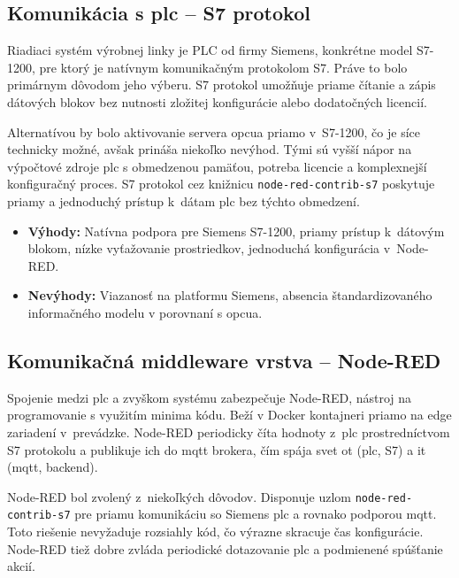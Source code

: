 \subsection{Komunikácia s \acrshort{plc} -- S7 protokol}

Riadiaci systém výrobnej linky je PLC od firmy Siemens, konkrétne model
S7-1200, pre ktorý je natívnym komunikačným protokolom S7. Práve to bolo
primárnym dôvodom jeho výberu. S7 protokol umožňuje priame čítanie a zápis
dátových blokov bez nutnosti zložitej konfigurácie alebo dodatočných licencií.

Alternatívou by bolo aktivovanie servera \acrshort{opcua} priamo v~S7-1200, čo
je síce technicky možné, avšak prináša niekoľko nevýhod. Tými sú vyšší nápor na
výpočtové zdroje \acrshort{plc} s obmedzenou pamäťou, potreba licencie a
komplexnejší konfiguračný proces. S7 protokol cez knižnicu
\texttt{node-red-contrib-s7} poskytuje priamy a jednoduchý prístup k~dátam
\acrshort{plc} bez týchto obmedzení.

\begin{itemize}
      \item \textbf{Výhody:} Natívna podpora pre Siemens S7-1200, priamy prístup k~dátovým blokom, nízke vyťažovanie prostriedkov, jednoduchá konfigurácia v~Node-RED.
      \item \textbf{Nevýhody:} Viazanosť na platformu Siemens, absencia štandardizovaného informačného modelu v porovnaní s \acrshort{opcua}.
\end{itemize}

\subsection{Komunikačná middleware vrstva -- Node-RED}

Spojenie medzi \acrshort{plc} a zvyškom systému zabezpečuje Node-RED, nástroj
na programovanie s využitím minima kódu. Beží v Docker kontajneri priamo na
edge zariadení v~prevádzke. Node-RED periodicky číta hodnoty z~\acrshort{plc}
prostredníctvom S7 protokolu a publikuje ich do \acrshort{mqtt} brokera, čím
spája svet \acrshort{ot} (\acrshort{plc}, S7) a \acrshort{it} (\acrshort{mqtt},
backend).

Node-RED bol zvolený z~niekoľkých dôvodov. Disponuje uzlom
\texttt{node-red-contrib-s7} pre priamu komunikáciu so Siemens \acrshort{plc} a
rovnako podporou \acrshort{mqtt}. Toto riešenie nevyžaduje rozsiahly
kód, čo výrazne skracuje čas konfigurácie. Node-RED tiež dobre zvláda
periodické dotazovanie \acrshort{plc} a podmienené spúšťanie akcií.

